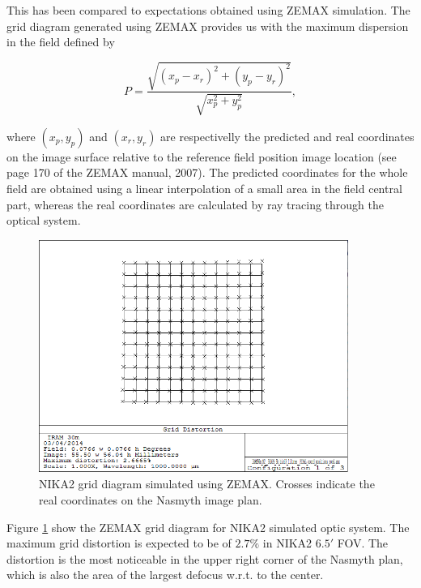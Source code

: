 This has been compared to expectations obtained using ZEMAX
simulation. The grid diagram generated using ZEMAX provides us with
the maximum dispersion in the field defined by

\begin{equation}
P = \frac{\sqrt{(x_p - x_r)^2 + (y_p - y_r)^2}}{\sqrt{x_p^2 + y_p^2}},
\end{equation}

where $(x_p, y_p)$ and $(x_r, y_r)$ are respectivelly the predicted
and real coordinates on the image surface relative to the reference
field position image location (see page 170 of the ZEMAX manual, 2007).
The predicted coordinates for the whole field are obtained using a
linear interpolation of a small area in the field central part,
whereas the real coordinates are calculated by ray tracing through the
optical system.

\begin{figure}[ht] 
\begin{center}
\includegraphics[width=0.9\textwidth]{Figures/NIKA2_Final_grid.png}
\caption[Simulated FOV grid]{NIKA2 grid diagram simulated using ZEMAX. Crosses indicate
  the real coordinates on the Nasmyth image plan. }
 \label{fig:fov_grid_distortion_zemax}
\end{center}
\end{figure}

Figure \ref{fig:fov_grid_distortion_zemax} show the ZEMAX grid diagram for
NIKA2 simulated optic system. The maximum grid distortion is expected
to be of $2.7\%$ in NIKA2 $6.5'$ FOV. The distortion is the most
noticeable in the upper right corner of the Nasmyth plan, which is
also the area of the largest defocus w.r.t. to the center. 

